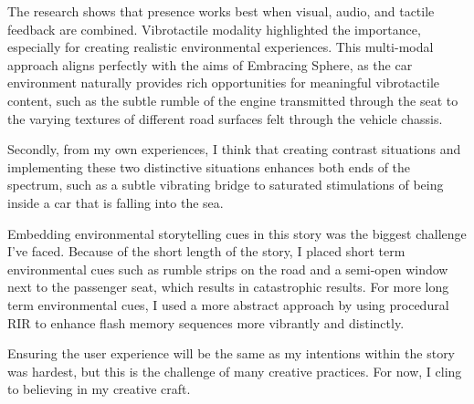         The research shows that presence works best when visual, audio, and tactile feedback are combined. Vibrotactile modality highlighted the importance, especially for creating realistic environmental experiences. This multi-modal approach aligns perfectly with the aims of Embracing Sphere, as the car environment naturally provides rich opportunities for meaningful vibrotactile content, such as the subtle rumble of the engine transmitted through the seat to the varying textures of different road surfaces felt through the vehicle chassis.\par

        Secondly, from my own experiences, I think that creating contrast situations and implementing these two distinctive situations enhances both ends of the spectrum, such as a subtle vibrating bridge to saturated stimulations of being inside a car that is falling into the sea.\par

        Embedding environmental storytelling cues in this story was the biggest challenge I've faced. Because of the short length of the story, I placed short term environmental cues such as rumble strips on the road and a semi-open window next to the passenger seat, which results in catastrophic results. For more long term environmental cues, I used a more abstract approach by using procedural RIR to enhance flash memory sequences more vibrantly and distinctly.\par

        Ensuring the user experience will be the same as my intentions within the story was hardest, but this is the challenge of many creative practices. For now, I cling to believing in my creative craft.\par
